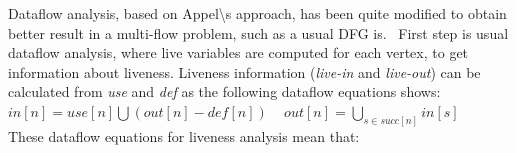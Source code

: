 Dataflow analysis, based on Appel\textbackslash{}\textquotesingle{}s approach, has been quite modified to obtain better result in a multi-\/flow problem, such as a usual D\+FG is.~\newline
 First step is usual dataflow analysis, where live variables are computed for each vertex, to get information about liveness. Liveness information ({\itshape live-\/in} and {\itshape live-\/out}) can be calculated from {\itshape use} and {\itshape def} as the following dataflow equations shows\+: ~\newline
~\newline
 $ in[n] = use[n] \bigcup (out[n] - def[n]) $ ~\newline
 $ out[n] = \bigcup_{s \in succ[n]} in[s] $ ~\newline
~\newline
 These dataflow equations for liveness analysis mean that\+:
